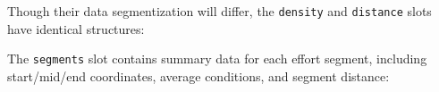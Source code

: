 \documentclass[
]{book}
\newenvironment{Shaded}{\begin{snugshade}}{\end{snugshade}}
\newcommand{\DecValTok}[1]{\textcolor[rgb]{0.00,0.00,0.81}{#1}}
\newcommand{\NormalTok}[1]{#1}
\newcommand{\OperatorTok}[1]{\textcolor[rgb]{0.81,0.36,0.00}{\textbf{#1}}}
\newcommand{\StringTok}[1]{\textcolor[rgb]{0.31,0.60,0.02}{#1}}
\begin{document}
Though their data segmentization will differ, the \texttt{density} and \texttt{distance} slots have identical structures:

\begin{Shaded}
\end{Shaded}

The \texttt{segments} slot contains summary data for each effort segment, including start/mid/end coordinates, average conditions, and segment distance:
\end{document}
